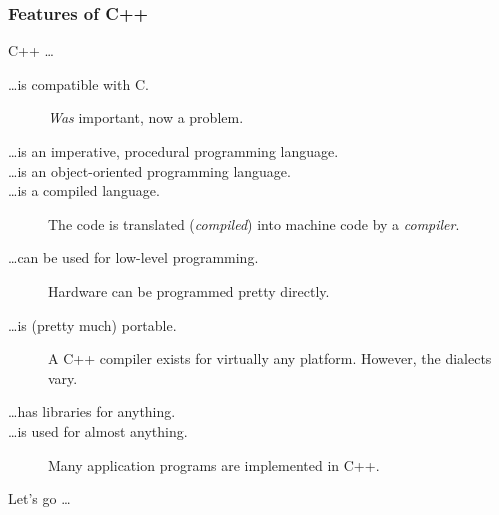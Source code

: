 \documentclass{slides}
\begin{document}
\begin{frame}
  \frametitle{Features of C++}
  C++ \dots
  \begin{description}
  \item[\dots is compatible with C.] \emph{Was} important, now a problem.
  \item[\dots is an imperative, procedural programming language.]
  \item[\dots is an object-oriented programming language.]
  \item[\dots is a compiled language.] The code is translated (\textit{compiled}) into machine code
    by a \textit{compiler}.
  \item[\dots can be used for low-level programming.] Hardware can be programmed pretty directly.
  \item[\dots is (pretty much) portable.] A C++ compiler exists for virtually any platform. However,
    the dialects vary.
  \item[\dots has libraries for anything.] 
  \item[\dots is used for almost anything.] Many application programs are implemented in C++.
  \end{description}
\end{frame}

\begin{frame}
  \vfill
  \centering
  \Huge Let's go \dots
  \vfill
\end{frame}
\end{document}
